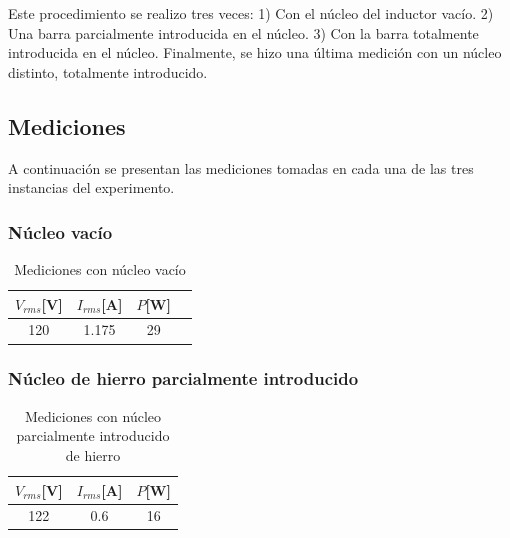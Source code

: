 \documentclass{article}
\begin{document}
            Este procedimiento se realizo tres veces: 1) Con el núcleo del inductor vacío. 2) Una barra parcialmente introducida en el núcleo. 3) Con la barra totalmente introducida en el núcleo. Finalmente, se hizo una última medición con un núcleo distinto, totalmente introducido.

        \subsection{Mediciones}
            
            A continuación se presentan las mediciones tomadas en cada una de las tres instancias del experimento.

            \subsubsection{Núcleo vacío}

            \begin{table}[H]
                \centering
                \begin{tabular}{|c|c|c|c|}
                    \hline
                    $V_{rms} $[V] & $I_{rms} $[A] & $P $[W]  \\ \hline
                    120           & 1.175         & 29     \\ \hline
                \end{tabular}
                \caption{Mediciones con núcleo vacío}
                \label{tab:mediciones-nucleo-vacio}
            \end{table}

            \subsubsection{Núcleo de hierro parcialmente introducido}

            \begin{table}[H]
                \centering
                \begin{tabular}{|c|c|c|}
                    \hline
                    $V_{rms} $[V] & $I_{rms} $[A] & $P $[W] \\ \hline
                    122           & 0.6         & 16    \\ \hline
                \end{tabular}
                \caption{Mediciones con núcleo parcialmente introducido de hierro}
                \label{tab:mediciones-nucleo-parcialmente-introducido-hierro}
            \end{table}
\end{document}
